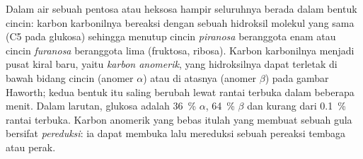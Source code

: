 \begin{proposition}\label{prop:b1:carbohydrates:rings}
Dalam air sebuah pentosa atau heksosa hampir seluruhnya berada dalam
bentuk cincin: karbon karbonilnya bereaksi dengan sebuah hidroksil
molekul yang sama (C5 pada glukosa) sehingga menutup cincin
\emph{piranosa} beranggota enam atau cincin \emph{furanosa} beranggota
lima (fruktosa, ribosa). Karbon karbonilnya menjadi pusat kiral baru,
yaitu \emph{karbon anomerik}, yang hidroksilnya dapat terletak di bawah
bidang cincin (anomer $\alpha$) atau di atasnya (anomer $\beta$) pada
gambar Haworth; kedua bentuk itu saling berubah lewat rantai terbuka
dalam beberapa menit. Dalam larutan, glukosa adalah \qty{36}{\%}
$\alpha$, \qty{64}{\%} $\beta$ dan kurang dari \qty{0.1}{\%} rantai
terbuka. Karbon anomerik yang bebas itulah yang membuat sebuah gula
bersifat \emph{pereduksi}: ia dapat membuka lalu mereduksi sebuah
pereaksi tembaga atau perak.
\end{proposition}

